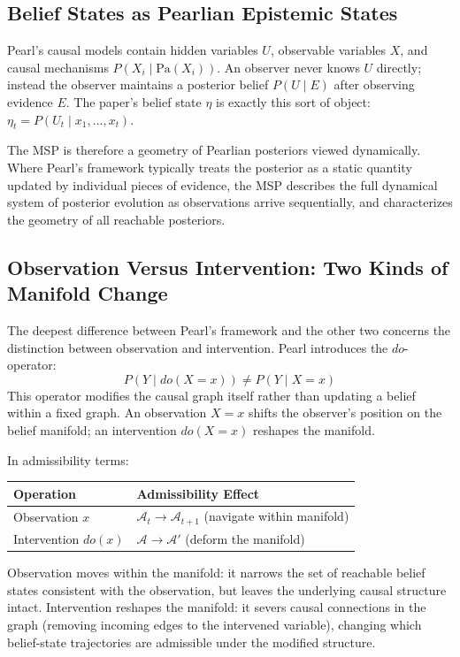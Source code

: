 \documentclass[12pt, a4paper]{article}
\theoremstyle{plain}
\theoremstyle{definition}
\theoremstyle{remark}
\begin{document}
\subsection{Belief States as Pearlian Epistemic States}

Pearl's causal models contain hidden variables $U$, observable variables $X$,
and causal mechanisms $P(X_i \mid \mathrm{Pa}(X_i))$. An observer never knows
$U$ directly; instead the observer maintains a posterior belief $P(U \mid E)$
after observing evidence $E$. The paper's belief state $\eta$ is exactly this
sort of object: $\eta_t = P(U_t \mid x_1, \ldots, x_t)$.

The MSP is therefore a geometry of Pearlian posteriors viewed dynamically.
Where Pearl's framework typically treats the posterior as a static quantity
updated by individual pieces of evidence, the MSP describes the full
dynamical system of posterior evolution as observations arrive sequentially,
and characterizes the geometry of all reachable posteriors.

\subsection{Observation Versus Intervention: Two Kinds of Manifold Change}

The deepest difference between Pearl's framework and the other two concerns
the distinction between observation and intervention. Pearl introduces the
$do$-operator:
$$P(Y \mid do(X = x)) \neq P(Y \mid X = x)$$
This operator modifies the causal graph itself rather than updating a
belief within a fixed graph. An observation $X = x$ shifts the observer's
position on the belief manifold; an intervention $do(X = x)$ reshapes the
manifold.

In admissibility terms:

\begin{center}
\begin{tabular}{ll}
\toprule
\textbf{Operation} & \textbf{Admissibility Effect} \\
\midrule
Observation $x$ & $\mathcal{A}_t \to \mathcal{A}_{t+1}$ (navigate within manifold) \\
Intervention $do(x)$ & $\mathcal{A} \to \mathcal{A}'$ (deform the manifold) \\
\bottomrule
\end{tabular}
\end{center}

Observation moves within the manifold: it narrows the set of reachable
belief states consistent with the observation, but leaves the underlying
causal structure intact. Intervention reshapes the manifold: it severs
causal connections in the graph (removing incoming edges to the intervened
variable), changing which belief-state trajectories are admissible under
the modified structure.
\end{document}
